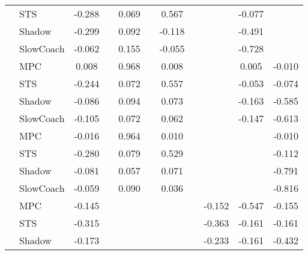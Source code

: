\begin{tabular}{|l|l|*{9}{c|}}
                                                           & STS &   -0.288 &        &     0.069 &     &  0.567 &     &      &  -0.077 &       \\
                                                           & Shadow &   -0.299 &        &     0.092 &     & -0.118 &     &      &  -0.491 &       \\
                                                           & SlowCoach &   -0.062 &        &     0.155 &     & -0.055 &     &      &  -0.728 &       \\
\midrule
[True, False, True, False, True, False, False, True, True] & MPC &    0.008 &        &     0.968 &     &  0.008 &     &      &   0.005 &   -0.010 \\
                                                           & STS &   -0.244 &        &     0.072 &     &  0.557 &     &      &  -0.053 &   -0.074 \\
                                                           & Shadow &   -0.086 &        &     0.094 &     &  0.073 &     &      &  -0.163 &   -0.585 \\
                                                           & SlowCoach &   -0.105 &        &     0.072 &     &  0.062 &     &      &  -0.147 &   -0.613 \\
\midrule
[True, False, True, False, True, False, False, False, True] & MPC &   -0.016 &        &     0.964 &     &  0.010 &     &      &      &   -0.010 \\
                                                           & STS &   -0.280 &        &     0.079 &     &  0.529 &     &      &      &   -0.112 \\
                                                           & Shadow &   -0.081 &        &     0.057 &     &  0.071 &     &      &      &   -0.791 \\
                                                           & SlowCoach &   -0.059 &        &     0.090 &     &  0.036 &     &      &      &   -0.816 \\
\midrule
[True, False, False, False, False, False, True, True, True] & MPC &   -0.145 &        &        &     &     &     &  -0.152 &  -0.547 &   -0.155 \\
                                                           & STS &   -0.315 &        &        &     &     &     &  -0.363 &  -0.161 &   -0.161 \\
                                                           & Shadow &   -0.173 &        &        &     &     &     &  -0.233 &  -0.161 &   -0.432 \\

\end{tabular}

